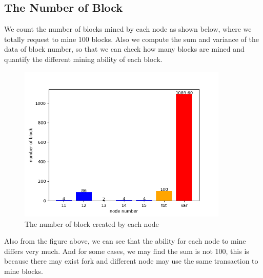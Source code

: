\documentclass{article}
\begin{document}
    \subsection{The Number of Block}
    We count the number of blocks mined by each node as shown below, where we totally request to mine 100 blocks. Also we compute the sum and variance of the data of block number, so that we can check how many blocks are mined and quantify the different mining ability of each block.
    \begin{figure}[H]
        \centering
        \includegraphics[width=10cm]{./eval/block.png}
        \caption{The number of block created by each node}
        \label{fig:my_label}
    \end{figure}
    Also from the figure above, we can see that the ability for each node to mine differs very much. And for some cases, we may find the sum is not 100, this is because there may exist fork and different node may use the same transaction to mine blocks.
    
\end{document}
